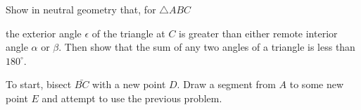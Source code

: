 \documentclass[noauthor,nooutcomes,12pt,hints,handout,newpage]{ximera}
\begin{document}
\begin{problem}
  Show in neutral geometry that, for $\triangle ABC$
\begin{image}
\end{image}
the exterior angle $\epsilon$ of the triangle at $C$ is greater than
either remote interior angle $\alpha$ or $\beta$. Then show that the
sum of any two angles of a triangle is less than $180^{\circ}$.


\begin{hint}
To start, bisect $\bar{BC}$ with a new point $D$. Draw a segment from
$A$ to some new point $E$ and attempt to use the previous problem.
\end{hint}



\end{problem}
\end{document}
